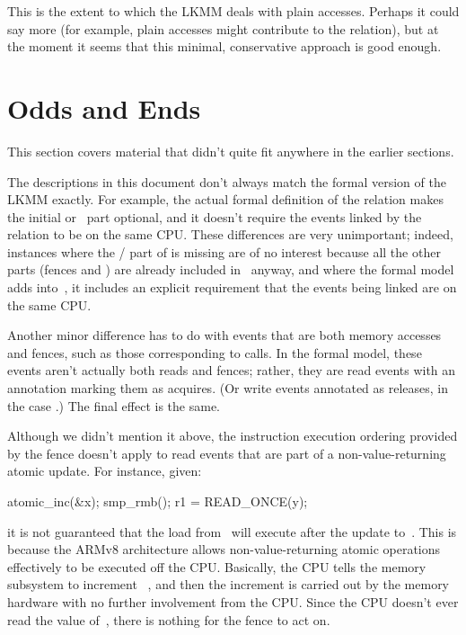 This is the extent to which the LKMM deals with plain accesses.
Perhaps it could say more (for example, plain accesses might
contribute to the  relation), but at the moment it seems that this
minimal, conservative approach is good enough.


\section{Odds and Ends}
\label{sec:docs:explanation:Odds and Ends}

This section covers material that didn't quite fit anywhere in the
earlier sections.

The descriptions in this document don't always match the formal
version of the LKMM exactly.
For example, the actual formal
definition of the  relation makes the initial  or~ part
optional, and it doesn't require the events linked by the relation to
be on the same CPU\@.
These differences are very unimportant; indeed,
instances where the / part of  is missing
are of no interest
because all the other parts (fences and ) are already included in~%
 anyway, and where the formal model adds  into~,
it includes
an explicit requirement that the events being linked are on the same
CPU\@.

Another minor difference has to do with events that are both memory
accesses and fences, such as those corresponding to 
calls.
In the formal model, these events aren't actually both reads
and fences; rather, they are read events with an annotation marking
them as acquires.
(Or write events annotated as releases, in the case
.)
The final effect is the same.

Although we didn't mention it above, the instruction execution
ordering provided by the  fence doesn't apply to read events
that are part of a non-value-returning atomic update.
For instance,
given:

\begin{VerbatimU}
	atomic_inc(&x);
	smp_rmb();
	r1 = READ_ONCE(y);
\end{VerbatimU}

\noindent%
it is not guaranteed that the load from~ will execute after the
update to~.
This is because the ARMv8 architecture allows
non-value-returning atomic operations effectively to be executed off
the CPU\@.
Basically, the CPU tells the memory subsystem to increment~%
, and then the increment is carried out by the memory hardware with
no further involvement from the CPU\@.
Since the CPU doesn't ever read
the value of~, there is nothing for the  fence to act on.

